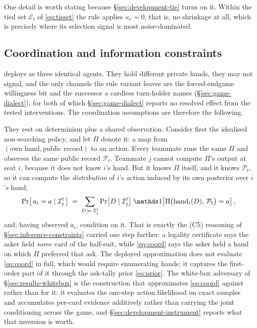 One detail is worth stating because \S\ref{sec:development-tie} turns on it. Within the tied set
$\mathcal{E}_t$ of \eqref{eq:tieset} the rule applies $\kappa_r = 0$, that is, no shrinkage at all,
which is precisely where its selection signal is most noise-dominated.

\subsection{Coordination and information constraints}
\label{sec:agent-coordination}

\sestina{} deploys as three identical agents. They hold different private hands, they may not
signal, and the only channels the rule variant leaves are the forced-endgame willingness bit and the
successor a cardless turn-holder names (\S\ref{sec:game-dialect}), for both of which
\S\ref{sec:game-dialect} reports no resolved effect from the tested interventions. The
coordination assumptions are therefore the following.

They rest on determinism plus a shared observation. Consider first the idealised non-searching
policy, and let $\Pi$ denote it: a map from $(\text{own hand}, \text{public record})$ to an action.
Every teammate runs the same $\Pi$ and observes the same public record $\mathcal{P}_t$. Teammate $j$ cannot compute $\Pi$'s output at seat
$i$, because it does not know $i$'s hand. But it knows $\Pi$ itself, and it knows $\mathcal{P}_t$, so
it can compute the \emph{distribution} of $i$'s action induced by its own posterior over $i$'s hand,
\begin{equation}
  \Pr\bigl[\,a_i = a \mid \mathcal{I}_j^t\,\bigr]
  \;=\; \sum_{D \,\models\, \mathcal{I}_j^t}
  \Pr\bigl[D \mid \mathcal{I}_j^t\bigr]\;
  \ind\!\left[\Pi\bigl(\text{hand}_i(D),\, \mathcal{P}_t\bigr) = a\right],
  \label{eq:coord}
\end{equation}
and, having observed $a_i$, condition on it. That is exactly the (C5) reasoning of
\S\ref{sec:inference-constraints} carried one step further: a legality certificate says the asker
held \emph{some} card of the half-suit, while \eqref{eq:coord} says the asker held a hand on which
$\Pi$ preferred that ask. The deployed approximation does not evaluate \eqref{eq:coord} in full,
which would require enumerating hands; it captures the first-order part of it through the ask-tally
prior \eqref{eq:prior}. The white-box adversary of \S\ref{sec:results-whitebox} is the construction
that approximates \eqref{eq:coord} against \sestina{} rather than for it: it evaluates the one-step
action likelihood on exact samples and accumulates per-card evidence additively rather than
carrying the joint conditioning across the game, and \S\ref{sec:development-instrument} reports
what that inversion is worth.

